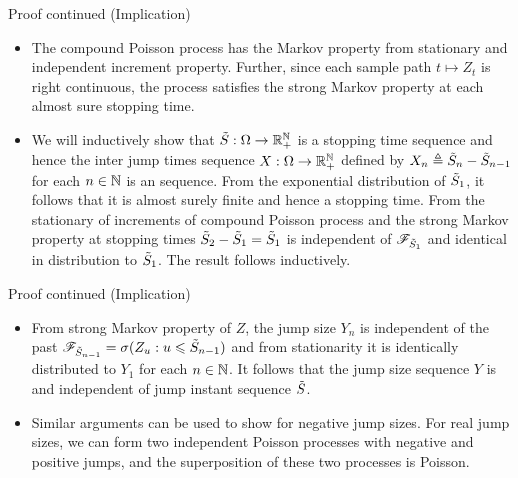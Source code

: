 \documentclass[12pt,aspectratio=169]{beamer}
\begin{document}
\begin{frame}
\begin{block}{Proof continued (Implication)}
\begin{itemize}
\item[Strong Markovity:] The compound Poisson process has the Markov property from stationary and independent increment property. 
Further, since each sample path $t \mapsto Z_t$ is right continuous, the process satisfies the strong Markov property at each almost sure stopping time. 

\item[Inter jump times \iid:]<2->
We will inductively show that $\tilde{S}:\Omega\to\mathbb{R}_+^{\mathbb{N}}$ is a stopping time sequence and hence the inter jump times sequence $X:\Omega\to\mathbb{R}_+^{\mathbb{N}}$ defined by $X_n \triangleq \tilde{S}_n-\tilde{S}_{n-1}$ for each $n\in\mathbb{N}$ is an \iid sequence. 
From the exponential distribution of $\tilde{S}_1$, it follows that it is almost surely finite and hence a stopping time. 
From the stationary of increments of compound Poisson process and the strong Markov property at stopping times $\tilde{S}_2 -\tilde{S}_1 = \tilde{S}_1$ is independent of $\mathscr{F}_{\tilde{S}_1}$ and identical in distribution to $\tilde{S}_1$. 
The result follows inductively. 
\end{itemize}
\end{block}
\end{frame}


\begin{frame}
\begin{block}{Proof continued (Implication)}
\begin{itemize}
\item[Jump size \iid: ] 
From strong Markov property of $Z$, the jump size $Y_n$ is independent of the past $\mathscr{F}_{\tilde{S}_{n-1}} = \sigma(Z_u: u \leqslant \tilde{S}_{n-1})$ and from stationarity it is identically distributed to $Y_1$ for each $n \in \mathbb{N}$. 
It follows that the jump size sequence $Y$ is \iid and independent of jump instant sequence $\tilde{S}$.  
\item[Superposition:]<2-> Similar arguments can be used to show for negative jump sizes. 
For real jump sizes, we can form two independent Poisson processes with negative and positive jumps, 
and the superposition of these two processes is Poisson. 
\end{itemize}
\end{block}
\end{frame}
\end{document}
